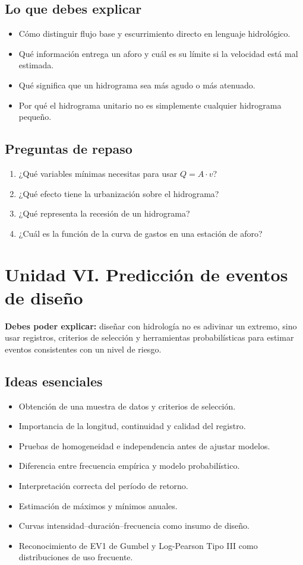 \documentclass[11pt]{article}
\begin{document}
\subsection{Lo que debes explicar}
\begin{itemize}
\item Cómo distinguir flujo base y escurrimiento directo en lenguaje hidrológico.
\item Qué información entrega un aforo y cuál es su límite si la velocidad está mal estimada.
\item Qué significa que un hidrograma sea más agudo o más atenuado.
\item Por qué el hidrograma unitario no es simplemente cualquier hidrograma pequeño.
\end{itemize}

\subsection{Preguntas de repaso}
\begin{enumerate}
\item ¿Qué variables mínimas necesitas para usar \(Q=A\cdot v\)?
\item ¿Qué efecto tiene la urbanización sobre el hidrograma?
\item ¿Qué representa la recesión de un hidrograma?
\item ¿Cuál es la función de la curva de gastos en una estación de aforo?
\end{enumerate}

\section{Unidad VI. Predicción de eventos de diseño}
\begin{conceptbox}
\textbf{Debes poder explicar:} diseñar con hidrología no es adivinar un extremo, sino usar registros, criterios de selección y herramientas probabilísticas para estimar eventos consistentes con un nivel de riesgo.
\end{conceptbox}

\subsection{Ideas esenciales}
\begin{itemize}
\item Obtención de una muestra de datos y criterios de selección.
\item Importancia de la longitud, continuidad y calidad del registro.
\item Pruebas de homogeneidad e independencia antes de ajustar modelos.
\item Diferencia entre frecuencia empírica y modelo probabilístico.
\item Interpretación correcta del período de retorno.
\item Estimación de máximos y mínimos anuales.
\item Curvas intensidad--duración--frecuencia como insumo de diseño.
\item Reconocimiento de EV1 de Gumbel y Log-Pearson Tipo III como distribuciones de uso frecuente.
\end{itemize}
\end{document}
